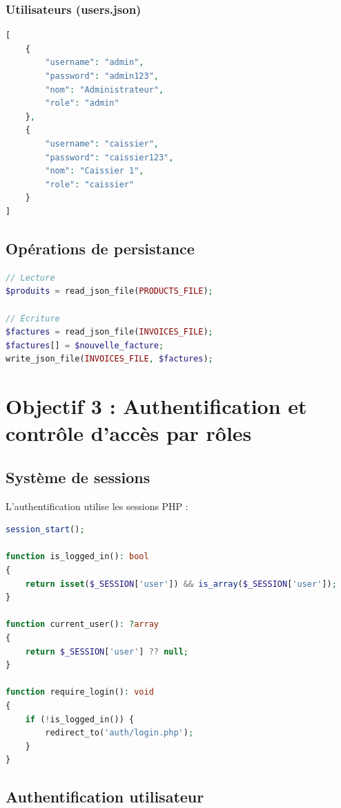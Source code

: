 \documentclass[12pt,a4paper,french]{report}
\begin{document}
\subsubsection{Utilisateurs (users.json)}
\begin{lstlisting}[language=PHP]
[
    {
        "username": "admin",
        "password": "admin123",
        "nom": "Administrateur",
        "role": "admin"
    },
    {
        "username": "caissier",
        "password": "caissier123",
        "nom": "Caissier 1",
        "role": "caissier"
    }
]
\end{lstlisting}

\subsection{Opérations de persistance}

\begin{lstlisting}[language=PHP, caption=Lecture et écriture JSON]
// Lecture
$produits = read_json_file(PRODUCTS_FILE);

// Écriture
$factures = read_json_file(INVOICES_FILE);
$factures[] = $nouvelle_facture;
write_json_file(INVOICES_FILE, $factures);
\end{lstlisting}

\section{Objectif 3 : Authentification et contrôle d'accès par rôles}

\subsection{Système de sessions}

L'authentification utilise les sessions PHP :

\begin{lstlisting}[language=PHP, caption=Gestion des sessions (auth/session.php)]
session_start();

function is_logged_in(): bool
{
    return isset($_SESSION['user']) && is_array($_SESSION['user']);
}

function current_user(): ?array
{
    return $_SESSION['user'] ?? null;
}

function require_login(): void
{
    if (!is_logged_in()) {
        redirect_to('auth/login.php');
    }
}
\end{lstlisting}

\subsection{Authentification utilisateur}
\end{document}
